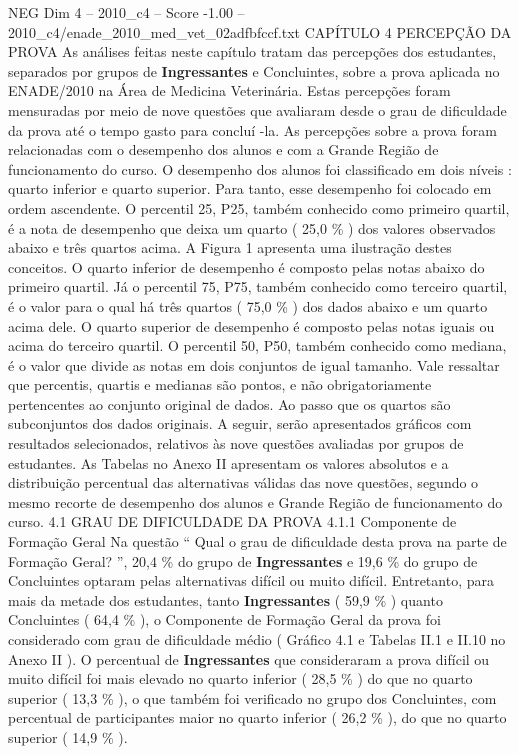 \begin{textsample}{NEG Dim 4 – 2010\_c4 – Score -1.00 – 2010\_c4/enade\_2010\_med\_vet\_02adfbfccf.txt}  \label{ex:f4_neg_062}
CAPÍTULO 4 PERCEPÇÃO DA PROVA As análises feitas neste capítulo tratam das percepções dos estudantes, separados por grupos de \textbf{Ingressantes} e Concluintes, sobre a prova aplicada no ENADE/2010 na Área de Medicina Veterinária.
Estas percepções foram mensuradas por meio de nove questões que avaliaram desde o grau de dificuldade da prova até o tempo gasto para concluí -la.
As percepções sobre a prova foram relacionadas com o desempenho dos alunos e com a Grande Região de funcionamento do curso.
O desempenho dos alunos foi classificado em dois níveis : quarto inferior e quarto superior.
Para tanto, esse desempenho foi colocado em ordem ascendente.
O percentil 25, P25, também conhecido como primeiro quartil, é a nota de desempenho que deixa um quarto ( 25,0 \% ) dos valores observados abaixo e três quartos acima.
A Figura 1 apresenta uma ilustração destes conceitos.
O quarto inferior de desempenho é composto pelas notas abaixo do primeiro quartil.
Já o percentil 75, P75, também conhecido como terceiro quartil, é o valor para o qual há três quartos ( 75,0 \% ) dos dados abaixo e um quarto acima dele.
O quarto superior de desempenho é composto pelas notas iguais ou acima do terceiro quartil.
O percentil 50, P50, também conhecido como mediana, é o valor que divide as notas em dois conjuntos de igual tamanho.
Vale ressaltar que percentis, quartis e medianas são pontos, e não obrigatoriamente pertencentes ao conjunto original de dados.
Ao passo que os quartos são subconjuntos dos dados originais.
A seguir, serão apresentados gráficos com resultados selecionados, relativos às nove questões avaliadas por grupos de estudantes.
As Tabelas no Anexo II apresentam os valores absolutos e a distribuição percentual das alternativas válidas das nove questões, segundo o mesmo recorte de desempenho dos alunos e Grande Região de funcionamento do curso. 4.1 GRAU DE DIFICULDADE DA PROVA 4.1.1 Componente de Formação Geral Na questão “ Qual o grau de dificuldade desta prova na parte de Formação Geral? ”, 20,4 \% do grupo de \textbf{Ingressantes} e 19,6 \% do grupo de Concluintes optaram pelas alternativas difícil ou muito difícil.
Entretanto, para mais da metade dos estudantes, tanto \textbf{Ingressantes} ( 59,9 \% ) quanto Concluintes ( 64,4 \% ), o Componente de Formação Geral da prova foi considerado com grau de dificuldade médio ( Gráfico 4.1 e Tabelas II.1 e II.10 no Anexo II ).
O percentual de \textbf{Ingressantes} que consideraram a prova difícil ou muito difícil foi mais elevado no quarto inferior ( 28,5 \% ) do que no quarto superior ( 13,3 \% ), o que também foi verificado no grupo dos Concluintes, com percentual de participantes maior no quarto inferior ( 26,2 \% ), do que no quarto superior ( 14,9 \% ).

\end{textsample}
